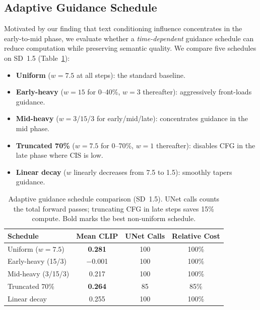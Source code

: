 \documentclass{article}
\begin{document}
\subsection{Adaptive Guidance Schedule}

Motivated by our finding that text conditioning influence concentrates in the early-to-mid phase, we evaluate whether a \emph{time-dependent} guidance schedule can reduce computation while preserving semantic quality. We compare five schedules on SD~1.5 (Table~\ref{tab:adaptive}):

\begin{itemize}[nosep, leftmargin=*]
    \item \textbf{Uniform} ($w{=}7.5$ at all steps): the standard baseline.
    \item \textbf{Early-heavy} ($w{=}15$ for 0--40\%, $w{=}3$ thereafter): aggressively front-loads guidance.
    \item \textbf{Mid-heavy} ($w{=}3$/$15$/$3$ for early/mid/late): concentrates guidance in the mid phase.
    \item \textbf{Truncated 70\%} ($w{=}7.5$ for 0--70\%, $w{=}1$ thereafter): disables CFG in the late phase where CIS is low.
    \item \textbf{Linear decay} ($w$ linearly decreases from 7.5 to 1.5): smoothly tapers guidance.
\end{itemize}

\begin{table}[t]
\centering
\small
\caption{Adaptive guidance schedule comparison (SD~1.5). UNet calls counts the total forward passes; truncating CFG in late steps saves 15\% compute. Bold marks the best non-uniform schedule.}
\label{tab:adaptive}
\vspace{2pt}
\begin{tabular}{@{}lccc@{}}
\toprule
Schedule & Mean CLIP & UNet Calls & Relative Cost \\
\midrule
Uniform ($w{=}7.5$)       & \textbf{0.281} & 100 & 100\% \\
Early-heavy (15/3)        & $-$0.001 & 100 & 100\% \\
Mid-heavy (3/15/3)        & 0.217 & 100 & 100\% \\
Truncated 70\%            & \textbf{0.264} & 85  & 85\% \\
Linear decay              & 0.255 & 100 & 100\% \\
\bottomrule
\end{tabular}
\end{table}
\end{document}
